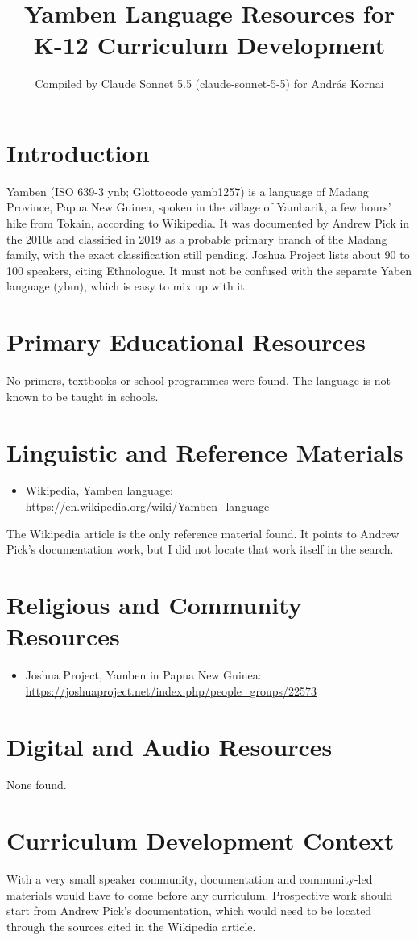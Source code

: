 \documentclass[12pt]{article}
\title{Yamben Language Resources for K-12 Curriculum Development}
\author{Compiled by Claude Sonnet 5.5 (claude-sonnet-5-5) for Andr\'as Kornai}
\date{}
\begin{document}
\maketitle

\section{Introduction}
Yamben (ISO 639-3 ynb; Glottocode yamb1257) is a language of Madang Province, Papua New Guinea, spoken in the village of Yambarik, a few hours' hike from Tokain, according to Wikipedia. It was documented by Andrew Pick in the 2010s and classified in 2019 as a probable primary branch of the Madang family, with the exact classification still pending. Joshua Project lists about 90 to 100 speakers, citing Ethnologue. It must not be confused with the separate Yaben language (ybm), which is easy to mix up with it.

\section{Primary Educational Resources}
No primers, textbooks or school programmes were found. The language is not known to be taught in schools.

\section{Linguistic and Reference Materials}
\begin{itemize}
\item Wikipedia, Yamben language: \url{https://en.wikipedia.org/wiki/Yamben_language}
\end{itemize}
The Wikipedia article is the only reference material found. It points to Andrew Pick's documentation work, but I did not locate that work itself in the search.

\section{Religious and Community Resources}
\begin{itemize}
\item Joshua Project, Yamben in Papua New Guinea: \url{https://joshuaproject.net/index.php/people_groups/22573}
\end{itemize}

\section{Digital and Audio Resources}
None found.

\section{Curriculum Development Context}
With a very small speaker community, documentation and community-led materials would have to come before any curriculum. Prospective work should start from Andrew Pick's documentation, which would need to be located through the sources cited in the Wikipedia article.
\end{document}
